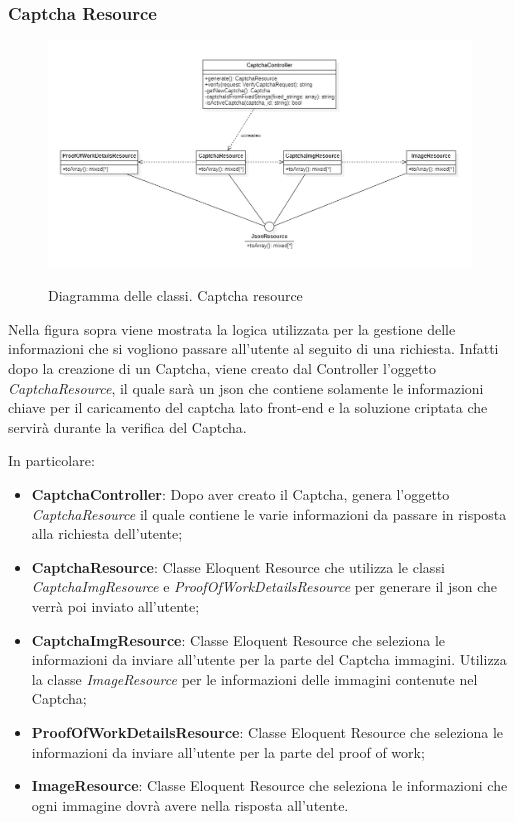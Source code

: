 \subsubsection{Captcha Resource}
\begin{figure}[H]
	\centering
	\includegraphics[scale = 0.6]{img/captcha_resource.png}\\
	\caption{Diagramma delle classi. Captcha resource}
\end{figure}

Nella figura sopra viene mostrata la logica utilizzata per la gestione delle informazioni che si vogliono passare all'utente al seguito di una richiesta. Infatti dopo la creazione di un Captcha, viene creato dal Controller l'oggetto \textit{CaptchaResource}, il quale sarà un json che contiene solamente le informazioni chiave per il caricamento del captcha lato front-end e la soluzione criptata che servirà durante la verifica del Captcha.

In particolare:
\begin{itemize}
	\item \textbf{CaptchaController}: Dopo aver creato il Captcha, genera l'oggetto \textit{CaptchaResource} il quale contiene le varie informazioni da passare in risposta alla richiesta dell'utente;
	\item \textbf{CaptchaResource}: Classe Eloquent Resource che utilizza le classi \textit{CaptchaImgResource} e \textit{ProofOfWorkDetailsResource} per generare il json che verrà poi inviato all'utente;
	\item \textbf{CaptchaImgResource}: Classe Eloquent Resource che seleziona le informazioni da inviare all'utente per la parte del Captcha immagini. Utilizza la classe \textit{ImageResource} per le informazioni delle immagini contenute nel Captcha;
	\item \textbf{ProofOfWorkDetailsResource}: Classe Eloquent Resource che seleziona le informazioni da inviare all'utente per la parte del proof of work;
	\item \textbf{ImageResource}: Classe Eloquent Resource che seleziona le informazioni che ogni immagine dovrà avere nella risposta all'utente.
\end{itemize}
\newpage

